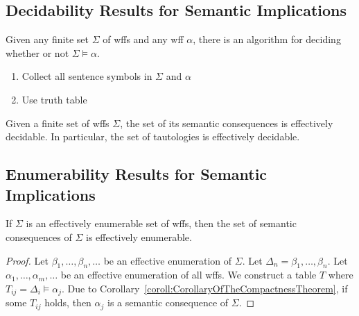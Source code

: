 \subsection{Decidability Results for Semantic Implications}

\begin{theorem}
    Given any finite set $\Sigma$ of wffs and any wff $\alpha$, there is an algorithm for deciding whether or not $\Sigma\vDash\alpha$.
\end{theorem}
\begin{enumerate}
    \item Collect all sentence symbols in $\Sigma$ and $\alpha$
    \item Use truth table
\end{enumerate}

\begin{corollary}
    Given a finite set of wffs $\Sigma$, the set of its semantic consequences is effectively decidable. In particular, the set of tautologies is effectively decidable.
\end{corollary}

\subsection{Enumerability Results for Semantic Implications}

\begin{theorem}
    If $\Sigma$ is an effectively enumerable set of wffs, then the set of semantic consequences of $\Sigma$ is effectively enumerable.
\end{theorem}
\begin{proof}
    Let $\beta_1,\dots,\beta_n,\dots$ be an effective enumeration of $\Sigma$. Let $\Delta_n=\beta_1,\dots,\beta_n$. Let $\alpha_1,\dots,\alpha_m,\dots$ be an effective enumeration of all wffs. We construct a table $T$ where $T_{ij} = \Delta_i \vDash \alpha_j$. Due to Corollary~\ref{coroll:CorollaryOfTheCompactnessTheorem}, if some $T_{ij}$ holds, then $\alpha_j$ is a semantic consequence of $\Sigma$.
\end{proof}